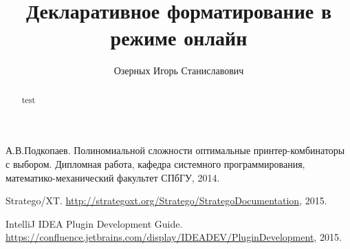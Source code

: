 
\title{Декларативное форматирование в режиме онлайн}


\author{Озерных Игорь Станиславович}



\maketitle             

\begin{abstract}
test
\end{abstract}






\begin{thebibliography}{99}
  А.В.Подкопаев. Полиномиальной сложности оптимальные принтер-комбинаторы с выбором.
  Дипломная работа, кафедра системного программирования, математико-механический факультет СПбГУ, 2014.

  Stratego/XT. \url{http://strategoxt.org/Stratego/StrategoDocumentation}, 2015.

  IntelliJ IDEA Plugin Development Guide. \url{https://confluence.jetbrains.com/display/IDEADEV/PluginDevelopment},
  2015.
\end{thebibliography}

